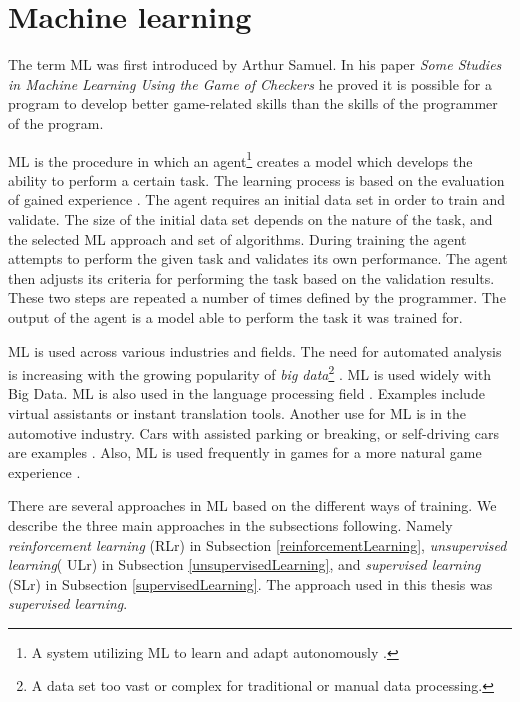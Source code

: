 \section{Machine learning} \label{machineLearning}
The term ML was first introduced by Arthur Samuel. In his paper \textit{Some Studies in Machine Learning Using the Game of Checkers} \cite{machineLearningOriginal} he proved it is possible for a program to develop better game-related skills than the skills of the programmer of the program.

ML is the procedure in which an agent\footnote{A system utilizing ML to learn and adapt autonomously \cite{machineLeraningApproaches}.} creates a model which develops the ability to perform a certain task. The learning process is based on the evaluation of gained experience \cite{machineLearningToday}. The agent requires an initial data set in order to train and validate. The size of the initial data set depends on the nature of the task, and the selected ML approach and set of algorithms. During training the agent attempts to perform the given task and validates its own performance. The agent then adjusts its criteria for performing the task based on the validation results. These two steps are repeated a number of times defined by the programmer. The output of the agent is a model able to perform the task it was trained for. 

ML is used across various industries and fields. The need for automated analysis is increasing with the growing popularity of \textit{big data}\footnote{A data set too vast or complex for traditional or manual data processing.} \cite{bigDataExplained} \cite{bigDataPopularity}. ML is used widely with Big Data. ML is also used in the language processing field \cite{machineLearningToday}. Examples include virtual assistants or instant translation tools. Another use for ML is in the automotive industry. Cars with assisted parking or breaking, or self-driving cars are examples \cite{selfDrivingCars}. Also, ML is used frequently in games for a more natural game experience \cite{machineLearningGaming}. 

There are several approaches in ML based on the different ways of training. We describe the three main approaches in the subsections following. Namely \textit{reinforcement learning} (RLr) in Subsection \ref{reinforcementLearning}, \textit{unsupervised learning}( ULr) in Subsection \ref{unsupervisedLearning}, and \textit{supervised learning} (SLr) in Subsection \ref{supervisedLearning}. The approach used in this thesis was \textit{supervised learning}. 

